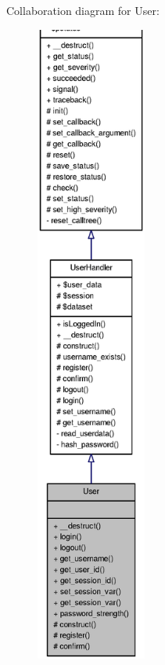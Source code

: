 Collaboration diagram for User:
\nopagebreak
\begin{figure}[H]
\begin{center}
\leavevmode
\includegraphics[height=600pt]{classUser__coll__graph}
\end{center}
\end{figure}

